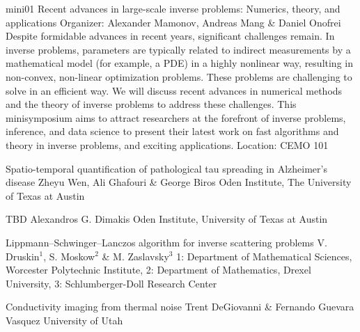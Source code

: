 \mini
{mini01}
{Recent advances in large-scale inverse problems: Numerics, theory, and applications}
{Organizer: Alexander Mamonov, Andreas Mang \& Daniel Onofrei}
{Despite formidable advances in recent years, significant challenges remain. In inverse problems, parameters are typically related to indirect measurements by a mathematical model (for example, a PDE) in a highly nonlinear way, resulting in non-convex, non-linear optimization problems. These problems are challenging to solve in an efficient way. We will discuss recent advances in numerical methods and the theory of inverse problems to address these challenges. This minisymposium aims to attract researchers at the forefront of inverse problems, inference, and data science to present their latest work on fast algorithms and theory in inverse problems, and exciting applications.}
{Location: CEMO 101}

\begin{talks}
\item\talk
{Spatio-temporal quantification of pathological tau spreading in Alzheimer's disease}
{Zheyu Wen, Ali Ghafouri \& George Biros}
{Oden Institute, The University of Texas at Austin}
\item\talk
{TBD}
{Alexandros G. Dimakis}
{Oden Institute, University of Texas at Austin}
\item\talk
{{L}ippmann--{S}chwinger--{L}anczos algorithm for inverse scattering problems}
{V. Druskin$^{1}$, S. Moskow$^{2}$ \& M. Zaslavsky$^{3}$}
{1: Department of Mathematical Sciences, Worcester Polytechnic Institute, 2: Department of Mathematics, Drexel University, 3: Schlumberger-Doll Research Center}
\item\talk
{Conductivity imaging from thermal noise}
{Trent DeGiovanni \& Fernando Guevara Vasquez}
{University of Utah}
\end{talks}

\room


